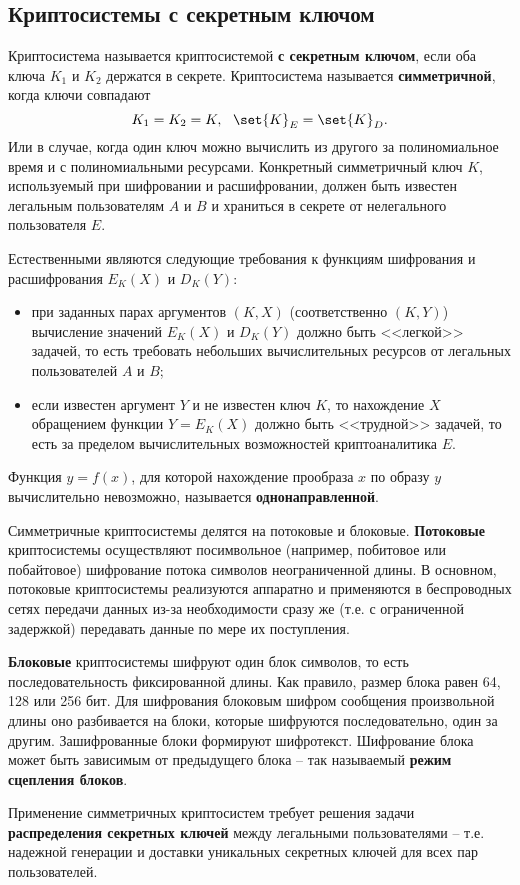 \subsection{Криптосистемы с секретным ключом}

Криптосистема  называется криптосистемой \textbf{с секретным ключом}, если оба ключа $K_1$ и $K_2$ держатся в секрете.
Криптосистема называется \textbf{симметричной}, когда ключи совпадают
    \[ K_1 = K_2 = K, ~~ \set{K}_E = \set{K}_D. \]
    Или в случае, когда один ключ можно вычислить из другого за полиномиальное время и с полиномиальными ресурсами.
Конкретный симметричный ключ $K$, используемый при шифровании и расшифровании, должен быть известен легальным пользователям $A$ и $B$ и храниться в секрете от нелегального пользователя $E$.

Естественными являются следующие требования к функциям шифрования и расшифрования  $E_K(X)$ и $D_K(Y)$:
\begin{itemize}
  \item при заданных парах аргументов $(K,X)$ (соответственно $(K,Y)$) вычисление значений $E_K(X)$ и $D_K(Y)$ должно быть <<легкой>> задачей, то есть требовать небольших вычислительных ресурсов от легальных пользователей $A$ и $B$;
  \item если известен аргумент $Y$ и не известен ключ $K$, то нахождение $X$ обращением  функции $Y = E_K(X)$
      должно быть <<трудной>> задачей, то есть за пределом вычислительных возможностей криптоаналитика $E$.
\end{itemize}

Функция $y = f(x)$, для которой нахождение прообраза $x$ по образу $y$ вычислительно невозможно, называется \textbf{однонаправленной}.

Симметричные криптосистемы делятся на потоковые и блоковые. \textbf{Потоковые} криптосистемы осуществляют посимвольное (например, побитовое или побайтовое) шифрование потока символов неограниченной длины. В основном, потоковые криптосистемы реализуются аппаратно и применяются в беспроводных сетях передачи данных из-за необходимости сразу же (т.е. с ограниченной задержкой) передавать данные по мере их поступления.

\textbf{Блоковые} криптосистемы шифруют один блок символов, то есть последовательность фиксированной длины. Как правило, размер блока равен 64, 128 или 256 бит. Для шифрования блоковым шифром  сообщения произвольной длины оно разбивается на блоки, которые шифруются последовательно, один за другим. Зашифрованные блоки формируют шифротекст. Шифрование блока может быть зависимым от предыдущего блока -- так называемый \textbf{режим сцепления блоков}.

Применение симметричных криптосистем требует решения задачи \textbf{распределения секретных ключей} между легальными пользователями -- т.е. надежной генерации и доставки уникальных секретных ключей для всех пар пользователей.
